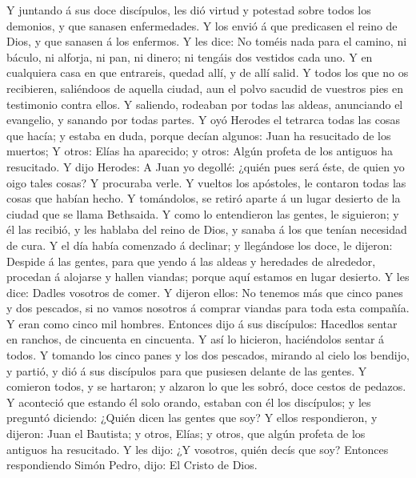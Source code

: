  Y juntando á sus doce discípulos, les dió virtud y potestad
sobre todos los demonios, y que sanasen enfermedades.  Y los
envió á que predicasen el reino de Dios, y que sanasen á los enfermos.
 Y les dice: No toméis nada para el camino, ni báculo, ni
alforja, ni pan, ni dinero; ni tengáis dos vestidos cada uno.
 Y en cualquiera casa en que entrareis, quedad allí, y de
allí salid.  Y todos los que no os recibieren, saliéndoos de
aquella ciudad, aun el polvo sacudid de vuestros pies en testimonio
contra ellos.  Y saliendo, rodeaban por todas las aldeas,
anunciando el evangelio, y sanando por todas partes.  Y oyó
Herodes el tetrarca todas las cosas que hacía; y estaba en duda, porque
decían algunos: Juan ha resucitado de los muertos;  Y otros:
Elías ha aparecido; y otros: Algún profeta de los antiguos ha
resucitado.  Y dijo Herodes: A Juan yo degollé: ¿quién pues
será éste, de quien yo oigo tales cosas? Y procuraba verle.
 Y vueltos los apóstoles, le contaron todas las cosas que
habían hecho. Y tomándolos, se retiró aparte á un lugar desierto de la
ciudad que se llama Bethsaida.  Y como lo entendieron las
gentes, le siguieron; y él las recibió, y les hablaba del reino de Dios,
y sanaba á los que tenían necesidad de cura.  Y el día
había comenzado á declinar; y llegándose los doce, le dijeron: Despide á
las gentes, para que yendo á las aldeas y heredades de alrededor,
procedan á alojarse y hallen viandas; porque aquí estamos en lugar
desierto.  Y les dice: Dadles vosotros de comer. Y dijeron
ellos: No tenemos más que cinco panes y dos pescados, si no vamos
nosotros á comprar viandas para toda esta compañía.  Y eran
como cinco mil hombres. Entonces dijo á sus discípulos: Hacedlos sentar
en ranchos, de cincuenta en cincuenta.  Y así lo hicieron,
haciéndolos sentar á todos.  Y tomando los cinco panes y
los dos pescados, mirando al cielo los bendijo, y partió, y dió á sus
discípulos para que pusiesen delante de las gentes.  Y
comieron todos, y se hartaron; y alzaron lo que les sobró, doce cestos
de pedazos.  Y aconteció que estando él solo orando,
estaban con él los discípulos; y les preguntó diciendo: ¿Quién dicen las
gentes que soy?  Y ellos respondieron, y dijeron: Juan el
Bautista; y otros, Elías; y otros, que algún profeta de los antiguos ha
resucitado.  Y les dijo: ¿Y vosotros, quién decís que soy?
Entonces respondiendo Simón Pedro, dijo: El Cristo de Dios.
